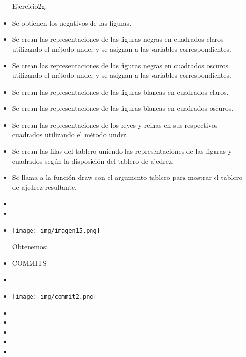 \documentclass{article}
\begin{document}
\begin{itemize}
        Ejercicio2g.  
        \item Se obtienen los negativos de las figuras.
        \item Se crean las representaciones de las figuras negras en cuadrados claros utilizando el método under y se asignan a las variables correspondientes.
        \item Se crean las representaciones de las figuras negras en cuadrados oscuros utilizando el método under y se asignan a las variables correspondientes.
        \item Se crean las representaciones de las figuras blancas en cuadrados claros.
        \item Se crean las representaciones de las figuras blancas en cuadrados oscuros.
        \item Se crean las representaciones de los reyes y reinas en sus respectivos cuadrados utilizando el método under.
        \item Se crean las filas del tablero uniendo las representaciones de las figuras y cuadrados según la disposición del tablero de ajedrez.
        \item Se llama a la función draw con el argumento tablero para mostrar el tablero de ajedrez resultante.

        \item[ ]{}
        \item[ ]{} 
        \item[ ]{\raisebox{-0.2\height} {\texttt{[image: img/imagen15.png]}}}
       
        Obtenemos:
        \item[ ]{}

        COMMITS
        \item[ ]{}
        \item[ ]{\raisebox{-0.2\height}  {\texttt{[image: img/commit2.png]}}}
        \item[ ]{}
        \item[ ]{}
        \item[ ]{}
        \item[ ]{}
        \item[ ]{}
           
	\end{itemize}
		
\end{document}
